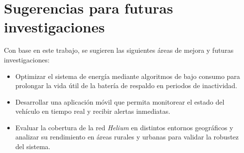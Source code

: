 \section{Sugerencias para futuras investigaciones}
Con base en este trabajo, se sugieren las siguientes áreas de mejora y futuras investigaciones:
\begin{itemize}
    \item Optimizar el sistema de energía mediante algoritmos de bajo consumo para prolongar la vida útil de la batería de respaldo en periodos de inactividad.
    \item Desarrollar una aplicación móvil que permita monitorear el estado del vehículo en tiempo real y recibir alertas inmediatas.
    \item Evaluar la cobertura de la red \textit{Helium} en distintos entornos geográficos y analizar su rendimiento en áreas rurales y urbanas para validar la robustez del sistema.
\end{itemize}

